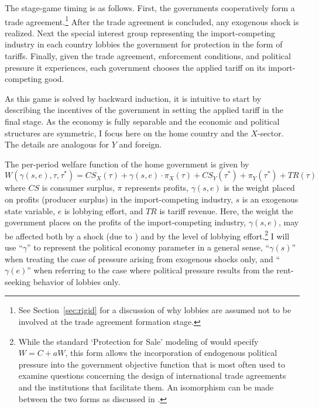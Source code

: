 \documentclass[12pt]{article}
\newcommand{\ga}{\gamma}
\begin{document}
The stage-game timing is as follows. First, the governments cooperatively form a trade agreement.\footnote{See Section~\ref{sec:rigid} for a discussion of why lobbies are assumed not to be involved at the trade agreement formation stage.} After the trade agreement is concluded, any exogenous shock is realized. Next the special interest group representing the import-competing industry in each country lobbies the government for protection in the form of tariffs. Finally, given the trade agreement, enforcement conditions, and political pressure it experiences, each government chooses the applied tariff on its import-competing good.

As this game is solved by backward induction, it is intuitive to start by describing the incentives of the government in setting the applied tariff in the final stage. As the economy is fully separable and the economic and political structures are symmetric, I focus here on the home country and the $X$-sector. The details are analogous for $Y$ and foreign.

The per-period welfare function of the home government is given by
\begin{equation}
  W(\ga(s,e),\tau,\tau^*) = \mathit{CS}_X(\tau) + \ga(s,e) \cdot \pi_X(\tau) + \mathit{CS}_Y(\tau^*) + \pi_Y(\tau^*) + \mathit{TR}(\tau)
  \label{eq:wel}
\end{equation}
where $\mathit{CS}$ is consumer surplus, $\pi$ represents profits, $\ga(s,e)$ is the weight placed on profits (producer surplus) in the import-competing industry, $s$ is an exogenous state variable, $e$ is lobbying effort, and $\mathit{TR}$ is tariff revenue. Here, the weight the government places on the profits of the import-competing industry, $\ga(s,e)$, may be affected both by a shock (due to \Textcite{ms2011}) and by the level of lobbying effort.\footnote{While the standard `Protection for Sale' modeling of \Textcite{gh94} would specify $W = C + aW$, this form allows the incorporation of endogenous political pressure into the government objective function that is most often used to examine questions concerning the design of international trade agreements and the institutions that facilitate them. An isomorphism can be made between the two forms as discussed in \Textcite{buzard2013b}.} I will use ``$\ga$'' to represent the political economy parameter in a general sense, ``$\ga(s)$'' when treating the case of pressure arising from exogenous shocks only, and ``$\ga(e)$'' when referring to the case where political pressure  results from the rent-seeking behavior of lobbies only.
\end{document}
